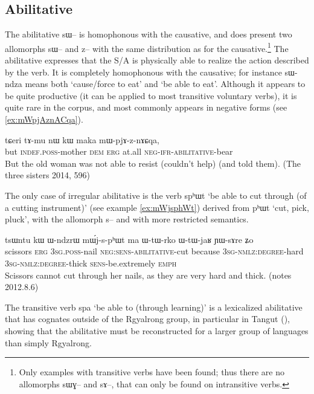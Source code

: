 \documentclass[oldfontcommands,oneside,a4paper,11pt]{article}
\newcommand{\ipa}[1]{{\phon \mbox{#1}}} %
\begin{document}
\subsection{Abilitative}
The abilitative \ipa{sɯ--} is homophonous with the causative, and does   present two allomorphs \ipa{sɯ--} and \ipa{z--} with the same distribution as for the causative.\footnote{Only examples with transitive verbs have been found; thus there are no allomorphs \ipa{sɯɣ--} and \ipa{sɤ--}, that can only be found on intransitive verbs.} The abilitative expresses that the S/A is physically able to realize the action described by the verb. It is completely homophonous with the causative; for instance \ipa{sɯ-ndza} means both `cause/force to eat' and `be able to eat'. Although it appears to be quite productive (it can be applied to most transitive voluntary verbs), it is quite rare in the corpus, and most commonly appears in negative forms (see \ref{ex:mWpjAznACqa}).

 \begin{exe}
\ex \label{ex:mWpjAznACqa}
\gll
\ipa{tɕeri} 	\ipa{tɤ-mu} 	\ipa{nɯ} 	\ipa{kɯ} 	\ipa{maka} 	\ipa{mɯ-pjɤ-z-nɤɕqa,} \\
but \textsc{indef.poss}-mother \textsc{dem} \textsc{erg} at.all \textsc{neg-ifr-abilitative}-bear \\
\glt But the old woman was not able to resist (couldn't help) (and told them). (The three sisters 2014, 596)
   \end{exe}

The only case of irregular abilitative is the verb \ipa{spʰɯt} `be able to cut through (of a cutting instrument)' (see example \ref{ex:mWjsphWt}) derived from \ipa{pʰɯt} `cut, pick, pluck', with the   allomorph \ipa{s--} and with more restricted semantics.

 \begin{exe}
\ex \label{ex:mWjsphWt}
\gll
\ipa{tsɯntu} 	\ipa{kɯ} 	\ipa{ɯ-ndzrɯ} 	\ipa{mɯ́j-s-pʰɯt} 	\ipa{ma} 	\ipa{ɯ-tɯ-rko} 	\ipa{ɯ-tɯ-jaʁ} 	\ipa{ɲɯ-sɤre} 	\ipa{ʑo} \\
scissors \textsc{erg} \textsc{3sg.poss}-nail \textsc{neg:sens-abilitative}-cut because \textsc{3sg-nmlz:degree}-hard \textsc{3sg-nmlz:degree}-thick \textsc{sens}-be.extremely \textsc{emph} \\
\glt Scissors cannot cut through her nails, as they are very hard and thick. (notes 2012.8.6)
   \end{exe}
   
The transitive verb \ipa{spa} `be able to (through learning)' is a lexicalized abilitative that has cognates outside of the Rgyalrong group, in particular in Tangut (\citealt[255-6]{jacques14esquisse}), showing that the abilitative must be reconstructed for a larger group of languages than simply Rgyalrong.
\end{document}
